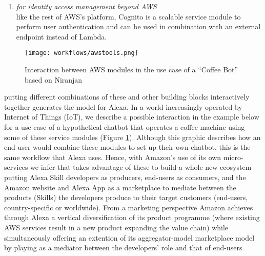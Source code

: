 \begin{enumerate}
	\item[\href{https://aws.amazon.com/cognito/}{\textbf{Cognito}} \footnote{\url{https://aws.amazon.com/cognito}}]
	\textit{for identity access management beyond AWS}\\
	like the rest of AWS's platform, Cognito is a scalable service module to perform user authentication and can be used in combination with an external endpoint instead of Lambda.
	
	
\end{enumerate}


\begin{figure}[h]
	\caption[Interaction Between AWS Modules (Coffee Bot)]{Interaction between AWS modules in the use case of a ``Coffee Bot'' based on Niranjan \cite{aws:lex_webinar} }\label{lex_interactionExample}
	\centering
	\texttt{[image: workflows/awstools.png]}
\end{figure}
%

putting different combinations of these and other building blocks interactively together generates the model for Alexa. In a world increasingly operated by Internet of Things (IoT), we describe a possible interaction in the example below for a use case of a hypothetical chatbot that operates a coffee machine using some of these service modules (Figure \ref{lex_interactionExample}).  Although this graphic describes how an end user would combine these modules to set up their own chatbot, this is the same workflow that Alexa uses. Hence, with Amazon's use of its own micro-services we infer that takes advantage of these to build a whole new ecosystem putting Alexa Skill developers as producers, end-users as consumers, and the Amazon website and Alexa App as a marketplace to mediate between the products (Skills) the developers produce to their target customers (end-users, country-specific or worldwide). From a marketing perspective Amazon achieves through Alexa a vertical diversification of its product programme (where existing AWS services result in a new product expanding the value chain) while simultaneously offering an extention of its aggregator-model marketplace model by playing as a mediator between the developers' role and that of end-users %




